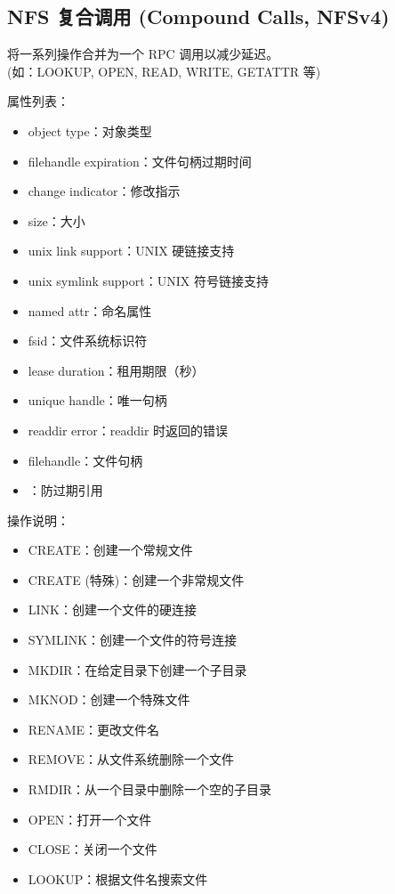 \subsection{NFS 复合调用 (Compound Calls, NFSv4)}
将一系列操作合并为一个 RPC 调用以减少延迟。\\
(如：LOOKUP, OPEN, READ, WRITE, GETATTR 等)

属性列表：
\begin{itemize}
    \item object type：对象类型
    \item filehandle expiration：文件句柄过期时间
    \item change indicator：修改指示
    \item size：大小
    \item unix link support：UNIX 硬链接支持
    \item unix symlink support：UNIX 符号链接支持
    \item named attr：命名属性
    \item fsid：文件系统标识符
    \item lease duration：租用期限（秒）
    \item unique handle：唯一句柄
    \item readdir error：readdir 时返回的错误
    \item filehandle：文件句柄
    \item [generation]：防过期引用
\end{itemize}

操作说明：
\begin{itemize}
    \item CREATE：创建一个常规文件
    \item CREATE (特殊)：创建一个非常规文件
    \item LINK：创建一个文件的硬连接
    \item SYMLINK：创建一个文件的符号连接
    \item MKDIR：在给定目录下创建一个子目录
    \item MKNOD：创建一个特殊文件
    \item RENAME：更改文件名
    \item REMOVE：从文件系统删除一个文件
    \item RMDIR：从一个目录中删除一个空的子目录
    \item OPEN：打开一个文件
    \item CLOSE：关闭一个文件
    \item LOOKUP：根据文件名搜索文件
\end{itemize}

